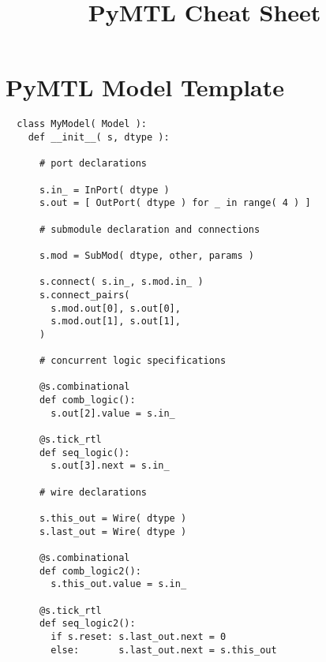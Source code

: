 \documentclass{cbxdoc}
\title{PyMTL Cheat Sheet}
\begin{document}


\maketitle
\bigskip


\section{PyMTL Model Template}

\begin{verbatim}
  class MyModel( Model ):
    def __init__( s, dtype ):

      # port declarations

      s.in_ = InPort( dtype )
      s.out = [ OutPort( dtype ) for _ in range( 4 ) ]

      # submodule declaration and connections

      s.mod = SubMod( dtype, other, params )

      s.connect( s.in_, s.mod.in_ )
      s.connect_pairs(
        s.mod.out[0], s.out[0],
        s.mod.out[1], s.out[1],
      )

      # concurrent logic specifications

      @s.combinational
      def comb_logic():
        s.out[2].value = s.in_

      @s.tick_rtl
      def seq_logic():
        s.out[3].next = s.in_

      # wire declarations

      s.this_out = Wire( dtype )
      s.last_out = Wire( dtype )

      @s.combinational
      def comb_logic2():
        s.this_out.value = s.in_

      @s.tick_rtl
      def seq_logic2():
        if s.reset: s.last_out.next = 0
        else:       s.last_out.next = s.this_out
\end{verbatim}

\clearpage

\end{document}
